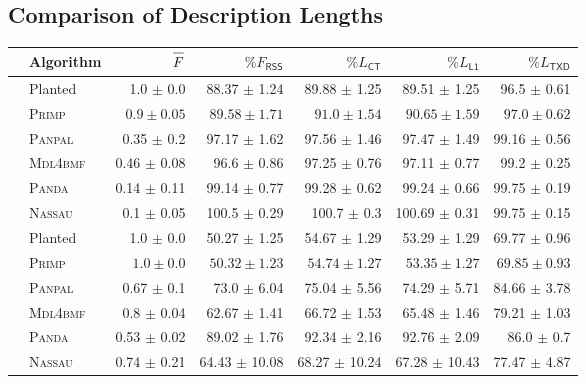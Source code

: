 \subsection{Comparison of Description Lengths}
\begin{table}%
	\centering
    \begin{adjustbox}{max width=\textwidth}
	\begin{tabular}{clrrrrr}\toprule
 & Algorithm & $\overline{F\strut}$ & $\%F_{\mathsf{RSS}}$ & $\%L_{\mathsf{CT}}$ & $\%L_{\mathsf{L1}}$  & $\%L_{\mathsf{TXD}}$  \\ \midrule
 \rowcolor{black!10}
\multirow{6}{*}{\cellcolor{white}\rotatebox{90}{ $p_\pm=25\%$ }  } 
&Planted& 1.0 $\pm$ 0.0 & 88.37 $\pm$ 1.24 & 89.88 $\pm$ 1.25 & 89.51 $\pm$ 1.25 & 96.5 $\pm$ 0.61\\
 & \textsc{Primp} & $\mathbf{0.9\pm0.05}$ & $\mathbf{89.58\pm1.71}$ & $\mathbf{91.0\pm1.54}$ & $\mathbf{90.65\pm1.59}$ & $\mathbf{97.0\pm0.62}$\\
 & \textsc{Panpal} & 0.35 $\pm$ 0.2 & 97.17 $\pm$ 1.62 & 97.56 $\pm$ 1.46 & 97.47 $\pm$ 1.49 & 99.16 $\pm$ 0.56\\
 & \textsc{Mdl4bmf} & 0.46 $\pm$ 0.08 & 96.6 $\pm$ 0.86 & 97.25 $\pm$ 0.76 & 97.11 $\pm$ 0.77 & 99.2 $\pm$ 0.25\\
 & \textsc{Panda} & 0.14 $\pm$ 0.11 & 99.14 $\pm$ 0.77 & 99.28 $\pm$ 0.62 & 99.24 $\pm$ 0.66 & 99.75 $\pm$ 0.19\\
 & \textsc{Nassau} & 0.1 $\pm$ 0.05 & 100.5 $\pm$ 0.29 & 100.7 $\pm$ 0.3 & 100.69 $\pm$ 0.31 & 99.75 $\pm$ 0.15\\
 \midrule
\rowcolor{black!10}
\multirow{6}{*}{\cellcolor{white}\rotatebox{90}{ $r^\star = 45$ }  }  
& Planted & 1.0 $\pm$ 0.0 &  50.27 $\pm$ 1.25 & 54.67 $\pm$ 1.29 & 53.29 $\pm$ 1.29 & 69.77 $\pm$ 0.96\\
 & \textsc{Primp} & $\mathbf{1.0\pm0.0}$ & $\mathbf{50.32\pm1.23}$ & $\mathbf{54.74\pm1.27}$ & $\mathbf{53.35\pm1.27}$ & $\mathbf{69.85\pm0.93}$\\
 & \textsc{Panpal} & 0.67 $\pm$ 0.1 & 73.0 $\pm$ 6.04 & 75.04 $\pm$ 5.56 & 74.29 $\pm$ 5.71 & 84.66 $\pm$ 3.78\\
 & \textsc{Mdl4bmf} & 0.8 $\pm$ 0.04 & 62.67 $\pm$ 1.41 & 66.72 $\pm$ 1.53 & 65.48 $\pm$ 1.46 & 79.21 $\pm$ 1.03\\
 & \textsc{Panda} & 0.53 $\pm$ 0.02 & 89.02 $\pm$ 1.76 & 92.34 $\pm$ 2.16 & 92.76 $\pm$ 2.09 & 86.0 $\pm$ 0.7\\
 & \textsc{Nassau} & 0.74 $\pm$ 0.21 & 64.43 $\pm$ 10.08 & 68.27 $\pm$ 10.24 & 67.28 $\pm$ 10.43 & 77.47 $\pm$ 4.87\\ \midrule

\end{tabular}
\end{adjustbox}
\end{table}
